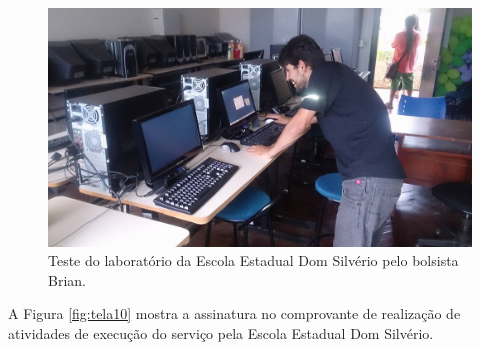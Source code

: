 \documentclass[
	12pt,				%
	openright,			%
	oneside,			%
	a4paper,			%
	english,			%
	spanish,			%
	brazil,				%
	]{abntex2}
\begin{document}
\begin{figure}[H]
	\centering
	\includegraphics[scale=0.2]{figuras/cris11.jpg}
	\caption{Teste do laboratório da Escola Estadual Dom Silvério pelo bolsista Brian.}
	\label{fig:tela11}
\end{figure}

A Figura \ref{fig:tela10} mostra a assinatura no comprovante de realização de atividades de execução do serviço pela Escola Estadual Dom Silvério.
\end{document}
